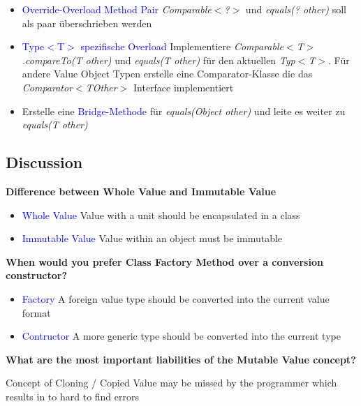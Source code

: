 \begin{itemize}
    \item \textcolor{blue}{Override-Overload Method Pair} \textit{Comparable$<$?$>$} und \textit{equals(? other)} soll als paar überschrieben werden
    \item \textcolor{blue}{Type$<$T$>$ spezifische Overload} Implementiere \textit{Comparable$<$T$>$.compareTo(T other)} und \textit{equals(T other)} für den aktuellen \textit{Typ$<$T$>$}. Für andere Value Object Typen erstelle eine Comparator-Klasse die das \textit{Comparator$<$TOther$>$} Interface implementiert
    \item Erstelle eine \textcolor{blue}{Bridge-Methode} für \textit{equals(Object other)} und leite es weiter zu \textit{equals(T other)}
\end{itemize}

\columnbreak

\subsection{Discussion}
\textbf{Difference between Whole Value and Immutable Value}
\begin{itemize}
    \item \textcolor{blue}{Whole Value} Value with a unit should be encapsulated in a class
    \item \textcolor{blue}{Immutable Value} Value within an object must be immutable
\end{itemize}
\vspace{10pt}
\textbf{When would you prefer Class Factory Method over a conversion constructor?}
\begin{itemize}
    \item \textcolor{blue}{Factory} A foreign value type should be converted into the current value format
    \item \textcolor{blue}{Contructor} A more generic type should be converted into the current type
\end{itemize}
\vspace{10pt}
\textbf{What are the most important liabilities of the Mutable Value concept?}

Concept of Cloning / Copied Value may be missed by the programmer which results in to hard to find errors

